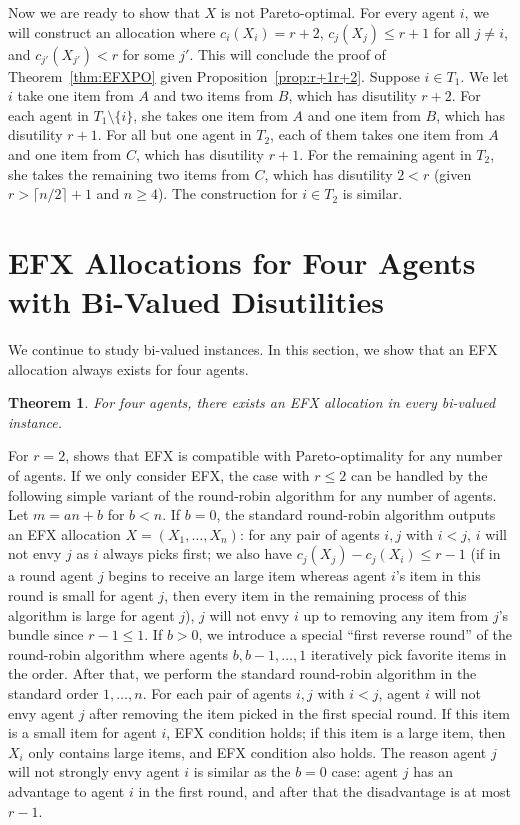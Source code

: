 \documentclass{article}
\newtheorem{theorem}{Theorem}
\theoremstyle{definition}
\begin{document}
Now we are ready to show that $X$ is not Pareto-optimal.
For every agent $i$, we will construct an allocation where $c_i(X_i)=r+2$, $c_j(X_j)\leq r+1$ for all $j\neq i$, and $c_{j'}(X_{j'})<r$ for some $j'$.
This will conclude the proof of Theorem~\ref{thm:EFXPO} given Proposition~\ref{prop:r+1r+2}.
Suppose $i\in T_1$.
We let $i$ take one item from $A$ and two items from $B$, which has disutility $r+2$.
For each agent in $T_1\setminus\{i\}$, she takes one item from $A$ and one item from $B$, which has disutility $r+1$.
For all but one agent in $T_2$, each of them takes one item from $A$ and one item from $C$, which has disutility $r+1$.
For the remaining agent in $T_2$, she takes the remaining two items from $C$, which has disutility $2<r$ (given $r>\lceil n/2\rceil+1$ and $n\geq 4$).
The construction for $i\in T_2$ is similar.

\section{EFX Allocations for Four Agents with Bi-Valued Disutilities}
We continue to study bi-valued instances.
In this section, we show that an EFX allocation always exists for four agents.

\begin{theorem}\label{thm:four}
    For four agents, there exists an EFX allocation in every bi-valued instance.
\end{theorem}

For $r=2$, \citet{lin2025approximately} shows that EFX is compatible with Pareto-optimality for any number of agents.
If we only consider EFX, the case with $r\leq 2$ can be handled by the following simple variant of the round-robin algorithm for any number of agents.
Let $m=an+b$ for $b<n$.
If $b=0$, the standard round-robin algorithm outputs an EFX allocation $X=(X_1,\ldots,X_n)$: for any pair of agents $i,j$ with $i<j$, $i$ will not envy $j$ as $i$ always picks first; we also have $c_j(X_j)-c_j(X_i)\leq r-1$ (if in a round agent $j$ begins to receive an large item whereas agent $i$'s item in this round is small for agent $j$, then every item in the remaining process of this algorithm is large for agent $j$), $j$ will not envy $i$ up to removing any item from $j$'s bundle since $r-1\leq1$.
If $b>0$, we introduce a special ``first reverse round'' of the round-robin algorithm where agents $b,b-1,\ldots,1$ iteratively pick favorite items in the order.
After that, we perform the standard round-robin algorithm in the standard order $1,\ldots,n$.
For each pair of agents $i,j$ with $i<j$, agent $i$ will not envy agent $j$ after removing the item picked in the first special round. If this item is a small item for agent $i$, EFX condition holds; if this item is a large item, then $X_i$ only contains large items, and EFX condition also holds.
The reason agent $j$ will not strongly envy agent $i$ is similar as the $b=0$ case: agent $j$ has an advantage to agent $i$ in the first round, and after that the disadvantage is at most $r-1$.
\end{document}
